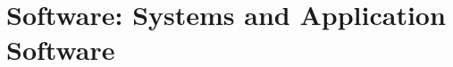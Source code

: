 \documentclass[\main/notes.tex]{subfiles}
\begin{document}
	\setcounter{chapter}{3}
	\chapter[Software]{Software: Systems and Application Software}
	\vbox{}
\end{document}
